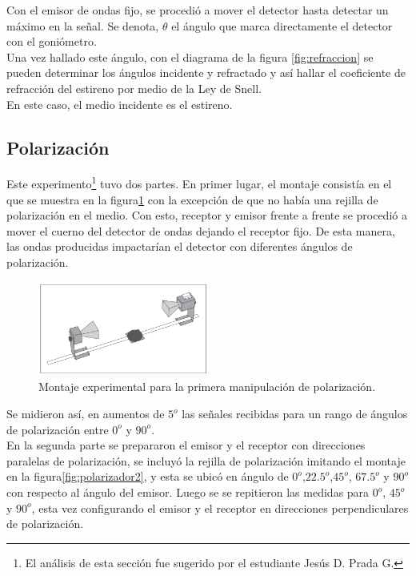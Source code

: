\documentclass[prb,aps,twocolumn,preprintnumbers,amsmath,amssymb]{revtex4}
\begin{document}
Con el emisor de ondas fijo, se procedió a mover el detector hasta detectar un máximo en la señal.  Se denota, $ \theta $ el ángulo que marca directamente el detector con el goniómetro. \\

Una vez hallado este ángulo, con el diagrama de la figura \ref{fig:refraccion} se pueden determinar los ángulos incidente y refractado y así hallar el coeficiente de refracción del estireno por medio de la Ley de Snell. \\

En este caso, el medio incidente es el estireno.
 
\subsection{Polarización}

Este experimento\footnote{El análisis de esta sección fue sugerido por el estudiante Jesús D. Prada G.} tuvo dos partes. En primer lugar, el montaje consistía en el que se muestra en la figura\footnotemark[6] \ref{fig:polarizador1} con la excepción de que no había una rejilla de polarización en el medio. Con esto, receptor y emisor frente a frente se procedió a mover el cuerno del detector de ondas dejando el receptor fijo. De esta manera, las ondas producidas impactarían el detector con diferentes ángulos de polarización.  

\begin{figure}[h!]
\centering
\includegraphics[width=0.5\textwidth]{polarizer1}
\caption{Montaje experimental para la primera manipulación de polarización.}
\label{fig:polarizador1}
\end{figure}

Se midieron así, en aumentos de $5^o$ las señales recibidas para un rango de ángulos de polarización entre $0^o$ y $90^o$. \\

En la segunda parte se prepararon el emisor y el receptor con direcciones paralelas de polarización, se incluyó la rejilla de polarización imitando el montaje en la figura\footnotemark[6] \ref{fig:polarizador2}, y esta se ubicó en ángulo de $0^o$,$22.5^o$,$45^o$, $67.5^o$ y $90^o$ con respecto al ángulo del emisor. Luego se  se repitieron las medidas para $0^o$, $45^o$ y $90^o$, esta vez configurando el emisor y el receptor en direcciones perpendiculares de polarización.
\end{document}

